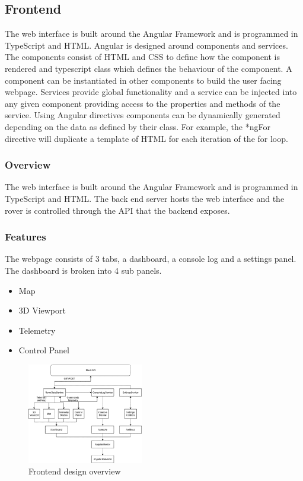 
\subsection{Frontend}

The web interface is built around the Angular Framework and is programmed in TypeScript and HTML.
Angular is designed around components and services. 
The components consist of HTML and CSS to define how the component is rendered and typescript class which defines the behaviour of the component. 
A component can be instantiated in other components to build the user facing webpage. 
Services provide global functionality and a service can be injected into any given component providing access to the properties and methods of the service. 
Using Angular directives components can be dynamically generated depending on the data as defined by their class. 
For example, the *ngFor directive will duplicate a template of HTML for each iteration of the for loop.

\subsubsection{Overview}
The web interface is built around the Angular Framework and is programmed in TypeScript 
and HTML. The back end server hosts the web interface and the rover is controlled through the API
that the backend exposes.

\subsubsection{Features}
The webpage consists of 3 tabs, a dashboard, a console log and a settings panel. 
The dashboard is broken into 4 sub panels.
\begin{itemize}
    \item Map
    \item 3D Viewport
    \item Telemetry
    \item Control Panel
\end{itemize}

\newpage
\begin{figure}
    \centerline{\includegraphics[width=0.45\textwidth]{images/frontend-flow.png}}
    \caption{Frontend design overview}
\end{figure}

